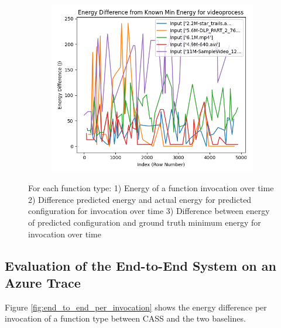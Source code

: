 \documentclass[times, 10pt,twocolumn]{article}
\begin{document}
\begin{figure}[ht]
\begin{subfigure}[b]{0.22\textwidth}
     \caption{}
     \label{fig:video_energy_diff}
   \end{subfigure}
   \hfill
   \begin{subfigure}[b]{0.22\textwidth}
      \includegraphics[width=\textwidth]{imgs/final_experiment_plots/model_analysis/measurement_data_analysis/video_compare_min.png}
     \caption{}
     \label{fig:video_compare_min}
   \end{subfigure}
   
   \caption{For each function type: 1) Energy of a function invocation over time 2) Difference predicted energy and actual energy for predicted configuration for invocation over time 3) Difference between energy of predicted configuration and ground truth minimum energy for invocation over time}
   \label{fig:model_performance_measurement_study}
 \end{figure}


  
 \subsection{Evaluation of the End-to-End System on an Azure Trace}
 \label{appendix:end-to-end_analysis}

 Figure \ref{fig:end_to_end_per_invocation} shows the energy difference per invocation of a function type between CASS and the two baselines. 
\end{document}
